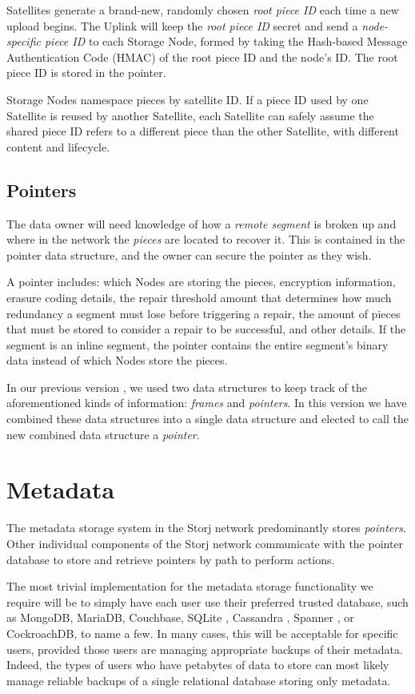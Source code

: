 \documentclass[8pt,fleqn,openany]{book}
\begin{document}
Satellites generate a brand-new, randomly chosen {\em root piece ID} each time
a new upload begins. The Uplink will keep the {\em root piece ID} secret and send
a {\em node-specific piece ID} to each Storage Node, formed by taking the Hash-based
Message Authentication Code (HMAC) of the root piece ID and the node's ID.
The root piece ID is stored in the pointer.

Storage Nodes namespace pieces by satellite ID. If a piece ID used by one
Satellite is reused by another Satellite, each Satellite can safely assume the shared piece ID refers
to a different piece than the other Satellite, with different content and lifecycle.

\subsection{Pointers}

The data owner will need knowledge of how a {\em remote segment} is broken up and
where in the network the {\em pieces} are located to recover it. This is contained
in the pointer data structure, and the owner can secure the pointer as
they wish.

A pointer includes: which Nodes are storing the pieces,
encryption information, erasure coding details,
the repair threshold amount that determines how much redundancy a segment
must lose before triggering a repair, the amount of pieces that must be
stored to consider a repair to be successful, and other details. If the
segment is an inline segment, the pointer contains the entire segment's binary
data instead of which Nodes store the pieces.

In our previous version \cite{storj-v2}, we used two data structures to keep
track of the aforementioned kinds of information:
{\em frames} and {\em pointers}.
In this version we have combined these data structures into a single data
structure and elected to call the new combined data structure a {\em pointer}.

\section{Metadata}\label{sec:concrete-metadata}

The metadata storage system in the Storj network predominantly stores
{\em pointers}. Other individual components of the Storj network communicate with
the pointer database to store and retrieve pointers by path to perform actions.

The most trivial implementation for the metadata storage functionality we
require will be to simply have each user use their preferred trusted database,
such as MongoDB, MariaDB, Couchbase, SQLite \cite{sqlite},
Cassandra \cite{cassandra}, Spanner \cite{spanner}, or CockroachDB,
to name a few. In many cases, this will
be acceptable for specific users, provided those users are managing appropriate
backups of their metadata. Indeed, the types of users who have petabytes of data
to store can most likely manage reliable backups of a single relational database
storing only metadata.
\end{document}
